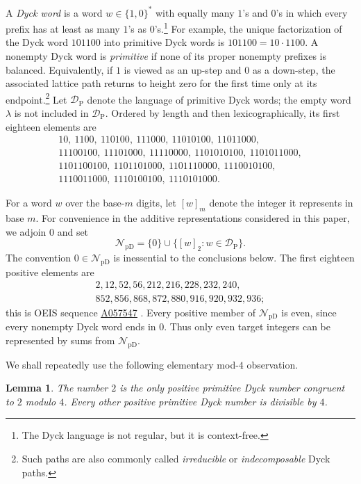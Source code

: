\documentclass[12pt]{article}
\theoremstyle{plain}
\newtheorem{lemma}[theorem]{Lemma}
\theoremstyle{definition}
\theoremstyle{plain}
\newcommand{\val}[2]{[#1]_{#2}}
\newcommand{\NpD}{\mathcal{N}_{\mathrm{pD}}}
\newcommand{\DP}{\mathcal{D}_{\mathrm{P}}}
\newcommand{\seqnum}[1]{\href{https://oeis.org/#1}{\rm \underline{#1}}}
\begin{document}
A \emph{Dyck word} is a word $w\in\{1,0\}^*$ with equally many $1$'s
and $0$'s in which every prefix has at least as many $1$'s as $0$'s.\footnote{The
Dyck language is not regular, but it is context-free.}  For example, the
unique factorization of the Dyck word $101100$ into primitive Dyck words is
$101100=10\cdot1100$.  A nonempty Dyck word is \emph{primitive} if none of
its proper nonempty prefixes is balanced.  Equivalently, if $1$ is viewed as
an up-step and $0$ as a down-step, the associated lattice path returns to
height zero for the first time only at its endpoint.\footnote{Such paths are
also commonly called \emph{irreducible} or \emph{indecomposable} Dyck paths.}
Let $\DP$ denote the language of primitive Dyck words; the empty word
$\lambda$ is not included in $\DP$.  Ordered by length and then
lexicographically, its first eighteen elements are
\[
\begin{gathered}
10,\ 1100,\ 110100,\ 111000,\ 11010100,\ 11011000,\\
11100100,\ 11101000,\ 11110000,\ 1101010100,\ 1101011000,\\
1101100100,\ 1101101000,\ 1101110000,\ 1110010100,\\
1110011000,\ 1110100100,\ 1110101000.
\end{gathered}
\]

For a word $w$ over the base-$m$ digits, let $\val{w}{m}$ denote the
integer it represents in base $m$.  For convenience in the additive
representations considered in this paper, we adjoin $0$ and set
\[
 \NpD=\{0\}\cup\{\val{w}{2}:w\in\DP\}.
\]
The convention $0\in\NpD$ is inessential to the conclusions below.  The
first eighteen positive elements are
\[
\begin{gathered}
2,12,52,56,212,216,228,232,240,\\
852,856,868,872,880,916,920,932,936;
\end{gathered}
\]
this is OEIS sequence \seqnum{A057547} \cite{OEIS-A057547}.  Every positive
member of $\NpD$ is even, since every nonempty Dyck word ends in $0$.
Thus only even target integers can be represented by sums from $\NpD$.

We shall repeatedly use the following elementary mod-$4$ observation.

\begin{lemma}\label{lem:mod4}
The number $2$ is the only positive primitive Dyck number congruent to
$2$ modulo $4$.  Every other positive primitive Dyck number is divisible
by $4$.
\end{lemma}
\end{document}
